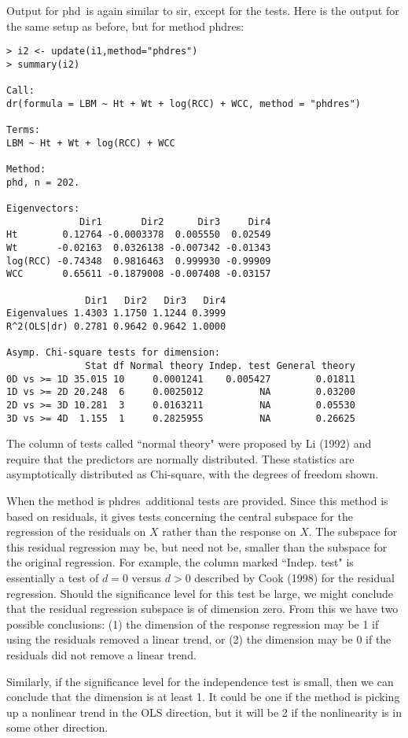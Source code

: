 \documentclass{article}
\newcommand{\sir}{{\sffamily sir}}
\newcommand{\phd}{{\sffamily phd}}
\newcommand{\phdres}{{\sffamily phdres}}
\begin{document}
Output for \phd\ is again similar to \sir, except for the tests.  Here is
the output for the same setup as before, but for method \phdres:
\small
\begin{verbatim}
> i2 <- update(i1,method="phdres")
> summary(i2)

Call:
dr(formula = LBM ~ Ht + Wt + log(RCC) + WCC, method = "phdres")

Terms:
LBM ~ Ht + Wt + log(RCC) + WCC

Method:
phd, n = 202.

Eigenvectors:
             Dir1       Dir2      Dir3     Dir4
Ht        0.12764 -0.0003378  0.005550  0.02549
Wt       -0.02163  0.0326138 -0.007342 -0.01343
log(RCC) -0.74348  0.9816463  0.999930 -0.99909
WCC       0.65611 -0.1879008 -0.007408 -0.03157

              Dir1   Dir2   Dir3   Dir4
Eigenvalues 1.4303 1.1750 1.1244 0.3999
R^2(OLS|dr) 0.2781 0.9642 0.9642 1.0000

Asymp. Chi-square tests for dimension:
              Stat df Normal theory Indep. test General theory
0D vs >= 1D 35.015 10     0.0001241    0.005427        0.01811
1D vs >= 2D 20.248  6     0.0025012          NA        0.03200
2D vs >= 3D 10.281  3     0.0163211          NA        0.05530
3D vs >= 4D  1.155  1     0.2825955          NA        0.26625
\end{verbatim}
\normalsize
The column of tests called ``normal theory" were proposed by Li (1992) and
require that the predictors are
normally distributed.  These statistics are asymptotically distributed as
Chi-square, with the degrees of freedom shown.

When the method is \phdres\, additional tests are provided.
Since this method is based on residuals, it gives tests concerning the
central subspace for the regression of the residuals on $X$ rather than the
response on $X$.  The subspace for this residual regression may be, but
need not be, smaller than the subspace for the original regression.
For example, the column
marked ``Indep. test" is essentially a test of $d=0$ versus $d>0$ described
by Cook (1998) for the residual regression.  Should the significance level
for this test be large, we might conclude that the residual regression
subspace is of dimension zero.  From this we have two possible conclusions:
(1) the dimension of the response regression may be 1 if using the residuals
removed a linear trend, or (2) the dimension may be 0 if the residuals did
not remove a linear trend.

Similarly, if the significance level for the independence test is small, then
we can conclude that the dimension is at least 1.  It could be one if the
method is picking up a nonlinear trend in the OLS direction, but it will be
2 if the nonlinearity is in some other direction.
\end{document}
